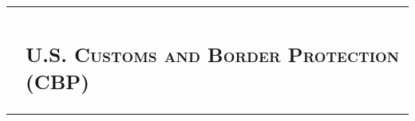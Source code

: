 \documentclass[letterpaper,10pt]{article}
\begin{document}
\begin{tabular}{R|p{6.2in}}
	                                                                                                                                                                                                                                                                                                                                                                                                                                                                                                                                                                                                                                                                                                                                                                                                                                                                                                                                                                                                                                                                                                                                                                                                                                                               \\

	                               & \subsection{\textsc{U.S. Customs and Border Protection (CBP)}}                                                                                                                                                                                                                                                                                                                                                                                                                                                                                                                                                                                                                                                                                                                                                                                                                                                                                                                                                                                                                                                                                                                                                                                    \\


\end{tabular}
\end{document}
